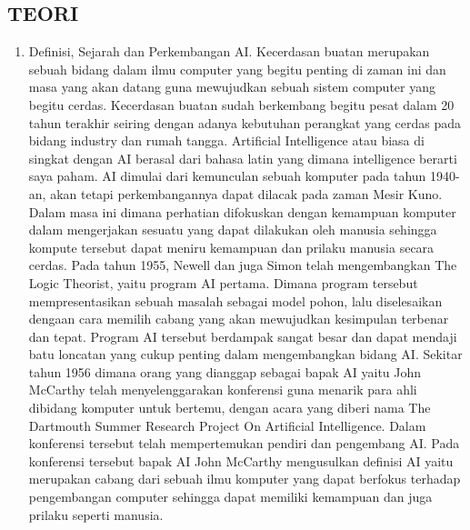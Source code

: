 \subsection{TEORI}
\begin {enumerate}
\item
Definisi, Sejarah dan Perkembangan AI.
\subitem
Kecerdasan buatan merupakan sebuah bidang dalam ilmu computer yang begitu penting di zaman ini dan masa yang akan datang guna mewujudkan sebuah sistem computer yang begitu cerdas. Kecerdasan buatan sudah berkembang begitu pesat dalam 20 tahun terakhir seiring dengan adanya kebutuhan perangkat yang cerdas pada bidang industry dan rumah tangga.
\subitem
Artificial Intelligence atau biasa di singkat dengan AI berasal dari bahasa latin yang dimana intelligence berarti saya paham. AI dimulai dari kemunculan sebuah komputer pada tahun 1940-an, akan tetapi perkembangannya dapat dilacak pada zaman Mesir Kuno. Dalam masa ini dimana perhatian difokuskan dengan kemampuan komputer dalam mengerjakan sesuatu yang dapat dilakukan oleh manusia sehingga kompute tersebut dapat meniru kemampuan dan prilaku manusia secara cerdas.
\subitem
Pada tahun 1955, Newell dan juga Simon telah mengembangkan The Logic Theorist, yaitu program AI pertama. Dimana program tersebut mempresentasikan sebuah masalah sebagai model pohon, lalu diselesaikan dengaan cara memilih cabang yang akan mewujudkan kesimpulan terbenar dan tepat. Program AI tersebut berdampak sangat besar dan dapat mendaji batu loncatan yang cukup penting dalam mengembangkan bidang AI. Sekitar tahun 1956 dimana orang yang dianggap sebagai bapak AI yaitu John McCarthy telah menyelenggarakan konferensi guna menarik para ahli dibidang komputer untuk bertemu, dengan acara yang diberi nama The Dartmouth Summer Research Project On Artificial Intelligence. Dalam konferensi tersebut telah mempertemukan pendiri dan pengembang AI. Pada konferensi tersebut bapak AI John McCarthy mengusulkan definisi AI yaitu merupakan cabang dari sebuah ilmu komputer yang dapat berfokus terhadap pengembangan computer sehingga dapat memiliki kemampuan dan juga prilaku seperti manusia.\cite{ baraja2008kecerdasan}


\end{enumerate}
